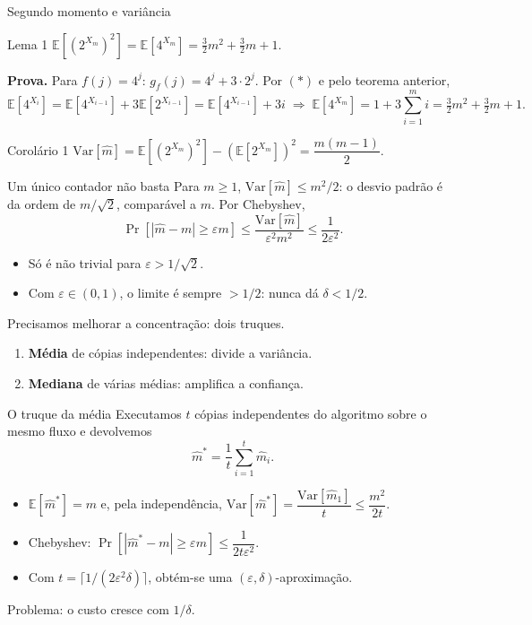 \documentclass[aspectratio=169,10pt]{beamer}
\newcommand{\teto}[1]{\lceil #1\rceil}
\newcommand{\Abs}[1]{\left|#1\right|}
\newcommand{\E}[1]{\mathbb{E}\!\left[#1\right]}
\newcommand{\Var}[1]{\mathrm{Var}\!\left[#1\right]}
\newcommand{\ProbE}[1]{\Pr\!\left[#1\right]}
\begin{document}
\begin{frame}{Segundo momento e variância}
  
  \begin{block}{Lema 1}
    $\E{(2^{X_m})^2} = \E{4^{X_m}} = \tfrac32m^2+\tfrac32m+1$.
  \end{block}

  \pause

  
  \textbf{Prova.} Para $f(j)=4^j$: $g_f(j)=4^j+3\cdot2^j$. Por $(\ast)$
  e pelo teorema anterior,
  \[
    \E{4^{X_i}}=\E{4^{X_{i-1}}}+3\E{2^{X_{i-1}}} =
    \E{4^{X_{i-1}}}+3i 
    \;\Rightarrow\;
    \E{4^{X_m}}=1+3\sum_{i=1}^m i=\tfrac32m^2+\tfrac32m+1.
  \]
  
  \pause

  \begin{block}{Corolário 1}
    $\Var{\widehat m}=\E{(2^{X_m})^2}-  ( \E {2^{X_m}})^2 =
    \dfrac{m(m-1)}2.$
  \end{block}
\end{frame}

\begin{frame}{Um único contador não basta}
  Para $m\geq1$, $\Var{\widehat m}\leq m^2/2$: o desvio padrão é da ordem
  de $m/\sqrt2$, comparável a $m$. Por Chebyshev,
  \[
    \ProbE{\Abs{\widehat m-m}\geq\varepsilon m}
    \leq\frac{\Var{\widehat m}}{\varepsilon^2m^2}\leq\frac1{2\varepsilon^2}.
  \]
  \begin{itemize}
  \item Só é não trivial para $\varepsilon>1/\sqrt2$.
  \item Com $\varepsilon\in(0,1)$, o limite é sempre $>1/2$: nunca dá
    $\delta<1/2$.
  \end{itemize}
  \medskip\pause
  \alert{Precisamos melhorar a concentração:} dois truques.
  \begin{enumerate}
  \item \textbf{Média} de cópias independentes: divide a variância.
  \item \textbf{Mediana} de várias médias: amplifica a confiança.
  \end{enumerate}
\end{frame}

\begin{frame}{O truque da média}
  Executamos $t$ cópias independentes do algoritmo sobre o mesmo fluxo e
  devolvemos
  \[
    \widehat m^*=\frac1t\sum_{i=1}^t\widehat m_i .
  \]
  \begin{itemize}
  \item $\E{\widehat m^*}=m$ e, pela independência,
    $\Var{\widehat m^*}=\dfrac{\Var{\widehat m_1}}t\leq\dfrac{m^2}{2t}$.
  \item Chebyshev:
    $\ProbE{\Abs{\widehat m^*-m}\geq\varepsilon m}\leq\dfrac1{2t\varepsilon^2}$.
  \item Com $t=\teto{1/(2\varepsilon^2\delta)}$, obtém-se uma
    $(\varepsilon,\delta)$-aproximação.
  \end{itemize}
  \alert{Problema:} o custo cresce com $1/\delta$.
\end{frame}
\end{document}
